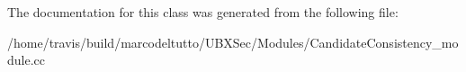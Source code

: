 The documentation for this class was generated from the following file\-:\begin{DoxyCompactItemize}
\item 
/home/travis/build/marcodeltutto/\-U\-B\-X\-Sec/\-Modules/Candidate\-Consistency\-\_\-module.\-cc\end{DoxyCompactItemize}
